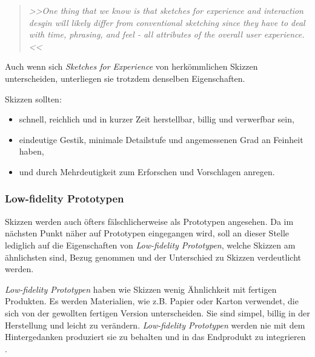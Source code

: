 \begin{quote}
	\textsl{>>One thing that we know is that sketches for experience and interaction desgin will likely differ from conventional sketching since they have to deal with time, phrasing, and feel - all attributes of the overall user experience.<<}
\begin{flushright}\citep{Buxton:2007}\end{flushright}
\end{quote}

Auch wenn sich \emph{Sketches for Experience} von herkömmlichen Skizzen unterscheiden, unterliegen sie trotzdem denselben Eigenschaften.

\medskip Skizzen sollten:
\begin{itemize}
	\item schnell, reichlich und in kurzer Zeit herstellbar, billig und verwerfbar sein,
	\item eindeutige Gestik, minimale Detailstufe und angemessenen Grad an Feinheit haben,
	\item und durch Mehrdeutigkeit zum Erforschen und Vorschlagen anregen.
\end{itemize}
\begin{flushright}\citep{Buxton:2007}\end{flushright}

\subsubsection{Low-fidelity Prototypen}  Skizzen werden auch öfters fälschlicherweise als Prototypen angesehen. Da im nächsten Punkt näher auf Prototypen eingegangen wird, soll an dieser Stelle lediglich auf die Eigenschaften von \emph{Low-fidelity Prototypen}, welche Skizzen am ähnlichsten sind, Bezug genommen und der Unterschied zu Skizzen verdeutlicht werden.

\medskip \emph{Low-fidelity Prototypen} haben wie Skizzen wenig Ähnlichkeit mit fertigen Produkten. Es werden Materialien, wie z.B. Papier oder Karton verwendet, die sich von der gewollten fertigen Version unterscheiden. Sie sind simpel, billig in der Herstellung und leicht zu verändern. \emph{Low-fidelity Prototypen} werden nie mit dem Hintergedanken produziert sie zu behalten und in das Endprodukt zu integrieren \citep{Sharp:2002}.

